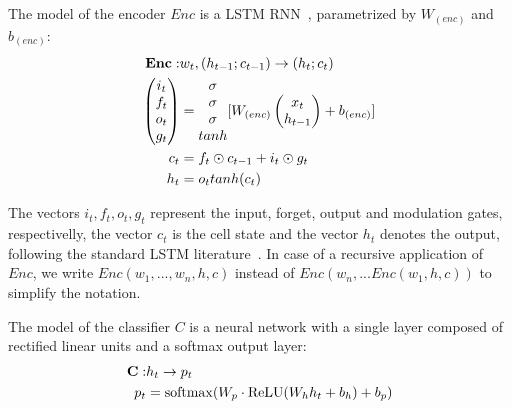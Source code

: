 \documentclass[10pt,twocolumn]{article}
\begin{document}
The model of the encoder $Enc$ is a LSTM RNN~\cite{hochreiter1997long,zaremba2014recurrent}, parametrized by $W_{(enc)}$ and $b_{(enc)}$:
\begin{align*}
\bf{Enc}: & w_t, (h_{t-1}; c_{t-1}) \rightarrow  (h_t; c_t) \\
\begin{pmatrix}
i_t \\
f_t \\
o_t \\
g_t
\end{pmatrix} &=
\begin{matrix}
\sigma \\
\sigma \\
\sigma \\
tanh
\end{matrix}
[
W_{(enc)}
\begin{pmatrix}
x_t \\
h_{t-1}
\end{pmatrix}
+
b_{(enc)}
] \\
c_t &= f_t \odot c_{t-1} + i_t \odot g_t \\
h_t &= o_t tanh(c_t)
\end{align*}

The vectors $i_t, f_t, o_t, g_t$ represent the input, forget, output and modulation gates, respectivelly, the vector $c_t$ is the cell state and the vector $h_t$ denotes the output, following the standard LSTM literature~\cite{hochreiter1997long,zaremba2014recurrent}.
In case of a recursive application of $Enc$, we write $Enc(w_1, ..., w_n, h, c)$ instead of $Enc(w_n, ... Enc(w_1, h, c))$ to simplify the notation.

The model of the classifier $C$ is a neural network with a single layer composed of rectified linear units and a softmax output layer:
\begin{align*}
\bf{C}: & h_t \rightarrow p_t \\
p_t &= \operatorname{softmax}(W_p \cdot \operatorname{ReLU}(W_h h_t + b_h) + b_p) \\
\end{align*}
\end{document}
